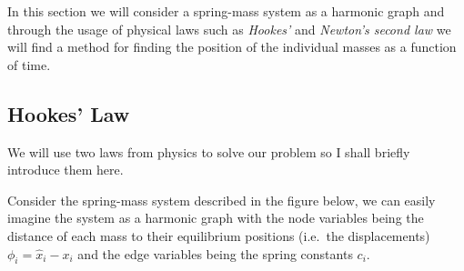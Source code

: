 \documentclass[]{article}
\begin{document}
In this section we will consider a spring-mass system as a harmonic
graph and through the usage of physical laws such as \emph{Hookes'} and
\emph{Newton's second law} we will find a method for finding the
position of the individual masses as a function of time.

\subsection{Hookes' Law}\label{hookes-law}

We will use two laws from physics to solve our problem so I shall
briefly introduce them here.

Consider the spring-mass system described in the figure below, we can
easily imagine the system as a harmonic graph with the node variables
being the distance of each mass to their equilibrium positions (i.e.~the
displacements) \(\phi_i = \hat{x}_i - x_i\) and the edge variables being
the spring constants \(c_i\).
\end{document}
